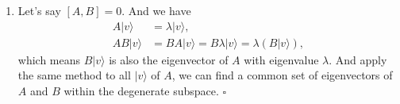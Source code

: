 \documentclass[../../main.tex]{subfiles}
\begin{document}
\begin{enumerate}
{{\begin{enumerate}
    So 
    \begin{align*}
      [A,B]|v\rangle = (AB-BA)|v\rangle = (AB|v\rangle - BA|v\rangle) = (\lambda\mu - \mu\lambda)|v\rangle = 0.
    \end{align*}
    for all $|v\rangle$, which means $[A,B]=0$.
    \item Let's say $[A,B]=0$. And we have 
    \begin{align*}
      A|v\rangle &= \lambda|v\rangle,\\
      AB|v\rangle &= BA|v\rangle = B\lambda|v\rangle = \lambda \left(B|v\rangle\right),
    \end{align*}
    which means $B|v\rangle$ is also the eigenvector of $A$ with eigenvalue $\lambda$. And apply the same method to all $|v\rangle$ of $A$, we can find a common set of eigenvectors of $A$ and $B$ within the degenerate subspace. $\square$
  \end{enumerate}}}
\end{enumerate}
\end{document}
